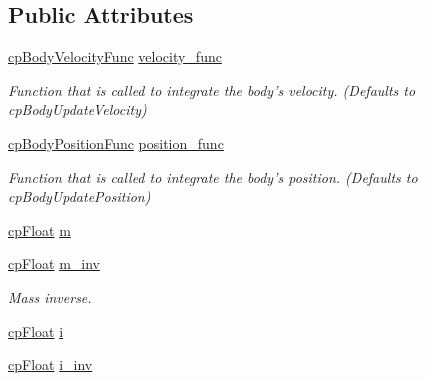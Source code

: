 \subsection*{Public Attributes}
\begin{DoxyCompactItemize}
\item 
\hypertarget{structcp_body_adc333a0be0d7953cad1fb4f6ee49dcf6}{\hyperlink{group__cp_body_ga728eb52bef6367e8e33abff7dba0a089}{cp\-Body\-Velocity\-Func} \hyperlink{structcp_body_adc333a0be0d7953cad1fb4f6ee49dcf6}{velocity\-\_\-func}}\label{structcp_body_adc333a0be0d7953cad1fb4f6ee49dcf6}

\begin{DoxyCompactList}\small\item\em Function that is called to integrate the body's velocity. (Defaults to cp\-Body\-Update\-Velocity) \end{DoxyCompactList}\item 
\hypertarget{structcp_body_a7da3dcd9ac7c689a1da1f97b37c292b9}{\hyperlink{group__cp_body_ga4f84c8fc20fcb9918d1553e6dc29ffbd}{cp\-Body\-Position\-Func} \hyperlink{structcp_body_a7da3dcd9ac7c689a1da1f97b37c292b9}{position\-\_\-func}}\label{structcp_body_a7da3dcd9ac7c689a1da1f97b37c292b9}

\begin{DoxyCompactList}\small\item\em Function that is called to integrate the body's position. (Defaults to cp\-Body\-Update\-Position) \end{DoxyCompactList}\item 
\hyperlink{group__basic_types_gac1ed65573e035bf892505768c852d8d3}{cp\-Float} \hyperlink{structcp_body_a883298164e53e4633b3daa4de92a9831}{m}
\item 
\hypertarget{structcp_body_a204a010e411c0f67e511a69f23d02025}{\hyperlink{group__basic_types_gac1ed65573e035bf892505768c852d8d3}{cp\-Float} \hyperlink{structcp_body_a204a010e411c0f67e511a69f23d02025}{m\-\_\-inv}}\label{structcp_body_a204a010e411c0f67e511a69f23d02025}

\begin{DoxyCompactList}\small\item\em Mass inverse. \end{DoxyCompactList}\item 
\hyperlink{group__basic_types_gac1ed65573e035bf892505768c852d8d3}{cp\-Float} \hyperlink{structcp_body_a4a47d0b30594a5fe28dd4de3cdf1450a}{i}
\item 
\hypertarget{structcp_body_a36b73e662173a240d1d8f09cdd468202}{\hyperlink{group__basic_types_gac1ed65573e035bf892505768c852d8d3}{cp\-Float} \hyperlink{structcp_body_a36b73e662173a240d1d8f09cdd468202}{i\-\_\-inv}}\label{structcp_body_a36b73e662173a240d1d8f09cdd468202}


\end{DoxyCompactItemize}
